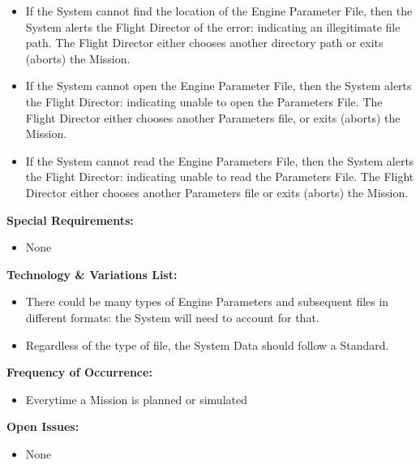 \documentclass[letterpaper]{article}
\begin{document}
\begin{itemize}
\item[2a,3a]If the System cannot find the location of the Engine 
   Parameter File, then the System alerts the Flight Director of the
   error:  indicating an illegitimate file path.  The Flight Director
   either chooses another directory path or exits (aborts) the 
   Mission.
\item[4a]If the System cannot open the Engine Parameter File, then
   the System alerts the Flight Director:  indicating unable to open
      the Parameters File.  The Flight Director either chooses another
      Parameters file, or exits (aborts) the Mission.
   \item[5a]If the System cannot read the Engine Parameters File, then
      the System alerts the Flight Director:  indicating unable to 
      read the Parameters File.  The Flight Director either chooses 
      another Parameters file or exits (aborts) the Mission.
\end{itemize}
\textbf{Special Requirements:}
\begin{itemize}
   \item None
\end{itemize}
\textbf{Technology \& Variations List:}
\begin{itemize}
   \item There could be many types of Engine Parameters and subsequent
      files in different formats:  the System will need to account 
      for that.
   \item Regardless of the type of file, the System Data should 
      follow a Standard.
\end{itemize}
\textbf{Frequency of Occurrence:}
\begin{itemize}
   \item Everytime a Mission is planned or simulated
\end{itemize}
\textbf{Open Issues:}
\begin{itemize}
   \item None
\end{itemize}
\end{document}
